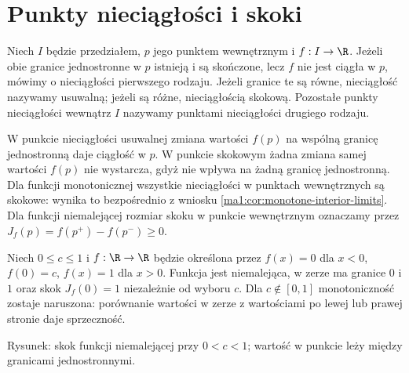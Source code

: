\section{Punkty nieciągłości i skoki}
\begin{definicja}
\label{ma1:def:discontinuity-types}
Niech $I$ będzie przedziałem, $p$ jego punktem wewnętrznym i $f:I\to\R$. Jeżeli obie granice jednostronne w $p$ istnieją i są skończone, lecz $f$ nie jest ciągła w $p$, mówimy o nieciągłości pierwszego rodzaju. Jeżeli granice te są równe, nieciągłość nazywamy usuwalną; jeżeli są różne, nieciągłością skokową. Pozostałe punkty nieciągłości wewnątrz $I$ nazywamy punktami nieciągłości drugiego rodzaju.
\end{definicja}
W punkcie nieciągłości usuwalnej zmiana wartości $f(p)$ na wspólną granicę jednostronną daje ciągłość w $p$. W punkcie skokowym żadna zmiana samej wartości $f(p)$ nie wystarcza, gdyż nie wpływa na żadną granicę jednostronną. Dla funkcji monotonicznej wszystkie nieciągłości w punktach wewnętrznych są skokowe: wynika to bezpośrednio z wniosku \ref{ma1:cor:monotone-interior-limits}. Dla funkcji niemalejącej rozmiar skoku w punkcie wewnętrznym oznaczamy przez $J_f(p)=f(p^+)-f(p^-)\ge0$.

\begin{przyklad}
\label{ma1:ex:monotone-jump}
Niech $0\le c\le1$ i $f:\R\to\R$ będzie określona przez $f(x)=0$ dla $x<0$, $f(0)=c$, $f(x)=1$ dla $x>0$. Funkcja jest niemalejąca, w zerze ma granice $0$ i $1$ oraz skok $J_f(0)=1$ niezależnie od wyboru $c$. Dla $c\notin[0,1]$ monotoniczność zostaje naruszona: porównanie wartości w zerze z wartościami po lewej lub prawej stronie daje sprzeczność.
\end{przyklad}
\begin{center}

\small Rysunek: skok funkcji niemalejącej przy $0<c<1$; wartość w punkcie leży między granicami jednostronnymi.
\end{center}

